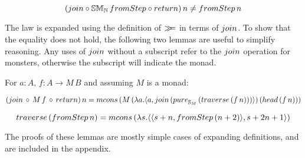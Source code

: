 $$
(\join \comp \stmon{\nat}\, \fromstepstr \comp \return)\, n 
\neq \fromstepstr\, n
$$

The law is expanded using the definition of $\mathbin{\gg\!\!=}$ in terms of $\join$. 
To show that the equality does not hold, the following two lemmas are useful to simplify reasoning. Any uses of $\join$ without a subscript refer to the $\join$ operation for monsters, otherwise the subscript will indicate the monad.

\begin{lemma}\label{lemma:general_bind_law}
For $a : A$, $f : A \rightarrow M\, B$ and assuming $M$ is a monad:

$$
(\join\, \comp\,  M\, f\, \comp\, \return)\, n = \mcons\, (M\,(\lambda a . \pair{a}{\join\, (\apure_{\stream{M}}\, (\traverse\, (f\, n)))})\, (\head\, (f\, n)))
$$
\end{lemma}

\begin{lemma}\label{lemma:traverse_fromstepstr}
$$
\traverse\, (\fromstepstr\, n) = \mcons\, (\lambda s . \pair{\pair{s+n}{\fromstepstr\, (n + 2)}}{s + 2n + 1})
$$
\end{lemma} 

The proofs of these lemmas are mostly simple cases of expanding definitions, and are included in the appendix.

